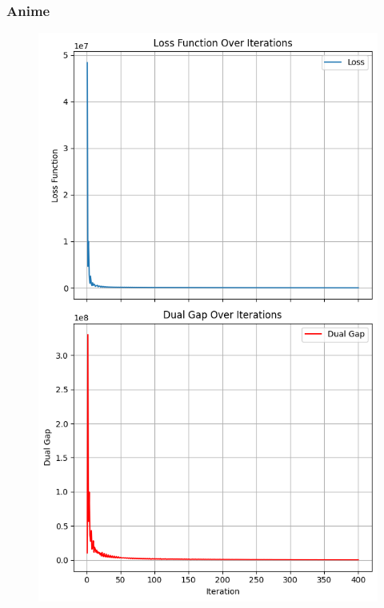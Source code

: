 \documentclass[12pt]{beamer}
\begin{document}
\begin{frame}
    \frametitle{Anime}
    \vspace{-0.5cm}
    \begin{figure}[H]
        \centering
        \hspace{-0.55cm}
        \includegraphics[height=0.75\textheight]{image/anime_loss_gap_diminishing.png}
        \hspace{-0.2cm}

\end{figure}
\end{frame}
\end{document}
